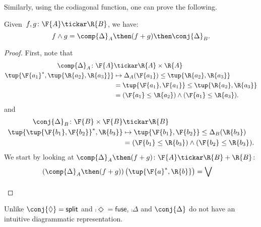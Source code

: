 Similarly, using the codiagonal function, one can prove the following.
\begin{lemma}
    Given~$f, g\colon \F{A} \tickar \R{B}$, we have:
    \begin{equation}
        f \wedge g = \comp{\Delta}_A \then(f + g) \then \conj{\Delta}_B.
    \end{equation}
\end{lemma}
\begin{proof}
First, note that
\begin{equation}
    \begin{aligned}
    \comp{\Delta}_A \colon \F{A}&\tickar \R{A}\times \R{A}\\
    \tup{\F{a_1}^*,\tup{\R{a_2},\R{a_3}}}&\mapsto \Delta_A(\F{a_1})\leq \tup{\R{a_2},\R{a_3}}\\
    &= \tup{\F{a_1},\F{a_1}}\leq \tup{\R{a_2},\R{a_3}}\\
    &= (\F{a_1}\leq \R{a_2}) \wedge (\F{a_1}\leq \R{a_3}).
    \end{aligned}
\end{equation}
and 
\begin{equation}
    \begin{aligned}
    \conj{\Delta}_B \colon \F{B}\times \F{B}&\tickar \R{B}\\
    \tup{\tup{\F{b_1},\F{b_2}}^*,\R{b_3}}&\mapsto \tup{\F{b_1},\F{b_2}}\leq \Delta_B(\R{b_3})\\
    &= (\F{b_1}\leq \R{b_3}) \wedge (\F{b_2}\leq \R{b_3}).
    \end{aligned}
\end{equation}
We start by looking at $\comp{\Delta}_A \then (f+g) \colon \F{A}\tickar \R{B}+\R{B}$:
\begin{equation}
    \begin{aligned}
    \left(\comp{\Delta}_A\then (f+g)\right)\left(\tup{\F{a}^*,\R{b}}\right)&=\bigvee_{}
    \end{aligned}
\end{equation}
\end{proof}
Unlike $\conj{\Diamond} = \mathsf{split}$ and $\comp{\Diamond} = \mathsf{fuse}$, $\comp{\Delta}$ and $\conj{\Delta}$ do not have an intuitive diagrammatic representation.